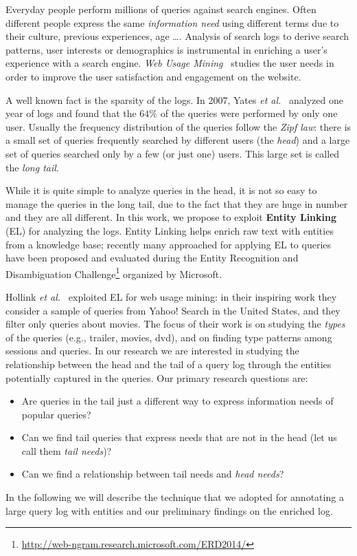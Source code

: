 
Everyday people perform millions of queries against search engines. Often different people express
the same \emph{information need} using different terms due to their culture, previous experiences,
age \dots. 
Analysis of search logs to derive search patterns, user interests or demographics is instrumental 
in enriching a user's experience with a search engine.   
\emph{Web Usage Mining}~\cite{silvestri2010mining}  
studies the user needs in order to improve the user satisfaction and engagement on the website. 

A well known fact is the sparsity of the logs. In 2007, Yates \emph{ et al.}~\cite{baeza2007impact} 
analyzed one year of logs and found that the $64\%$ of the queries were performed by only one user.
Usually the frequency distribution of the queries follow the \emph{Zipf law}: there is a small 
set of queries frequently searched by different users (the \emph{head}) and a large set of queries
searched only by a few (or just one) users. This large set is called the \emph{long tail}.

While it is quite simple to analyze queries in the head, it is not so easy to manage the queries in the long tail, 
due to the fact that they are huge in number and they are all different. In this work, we propose
to exploit \textbf{Entity Linking} (EL) for analyzing the logs. Entity Linking helps enrich raw text with entities 
from a knowledge base; recently many approached for applying 
EL to queries have been proposed and evaluated during the Entity Recognition and Disambiguation Challenge\footnote{
\url{http://web-ngram.research.microsoft.com/ERD2014/}} organized by Microsoft. 

Hollink \emph{et al.}~\cite{hollink2013web} exploited EL for web usage mining: in their inspiring work they consider a sample of 
queries from Yahoo! Search in the United States, and they filter only queries about movies. The focus
of their work is on studying the \emph{types} of the queries (e.g., trailer, movies, dvd), and on finding
type patterns among sessions and queries. In our research we are interested in studying the 
relationship between the head and the tail of a query log
through the entities potentially captured in the queries. Our primary research questions are:
\begin{itemize}
	\item Are queries in the tail just a different way to express information needs of popular queries? 
	\item Can we find tail queries that express needs that are not in the head (let us call them \emph{tail needs})?
	\item Can we find a relationship between tail needs and \emph{head needs}?  
\end{itemize} 

In the following we will describe the technique that we adopted for annotating a large query log with entities 
and our preliminary findings on the enriched log.


 
